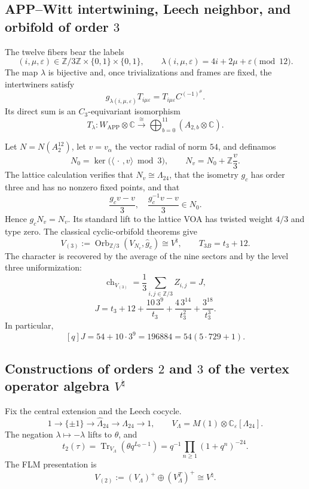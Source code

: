 \subsection{APP--Witt intertwining, Leech neighbor, and orbifold of order \(3\)}

The twelve fibers bear the labels
\[
 (i,\mu,\varepsilon)\in
 \mathbb Z/3\mathbb Z\times\{0,1\}\times\{0,1\},
 \qquad
 \lambda(i,\mu,\varepsilon)=4i+2\mu+\varepsilon\pmod{12}.
\]
The map \(\lambda\) is bijective and, once trivializations and frames are fixed,
the intertwiners satisfy
\[
 g_{\lambda(i,\mu,\varepsilon)}T_{i\mu\varepsilon}
 =T_{i\mu\varepsilon}C^{(-1)^\mu}.
\]
Its direct sum is an \(C_3\)-equivariant isomorphism
\[
 T_\lambda:W_{\mathrm{APP}}\otimes\mathbb C
 \xrightarrow{\ \cong\ }
 \bigoplus_{b=0}^{11}(A_{2,b}\otimes\mathbb C).
\]

Let \(N=N(A_2^{12})\), let \(v=v_\alpha\) the vector radial of norm \(54\),
and definamos
\[
 N_0=\ker\bigl(\langle\,\cdot\,,v\rangle\bmod3\bigr),
 \qquad N_v=N_0+\mathbb Z\frac v3.
\]
The lattice calculation verifies that \(N_v\cong\Lambda_{24}\), that the
isometry \(g_c\) has order three and has no nonzero fixed points, and that
\[
 \frac{g_cv-v}{3},\quad\frac{g_c^{-1}v-v}{3}\in N_0.
\]
Hence \(g_cN_v=N_v\). Its standard lift to the lattice VOA has twisted
weight \(4/3\) and type zero. The classical cyclic-orbifold theorems give
\[
 V_{(3)}:=\operatorname{Orb}_{\mathbb Z/3}
       (V_{N_v},\widehat g_c)\cong V^\natural,
 \qquad T_{3B}=t_3+12.
\]
The character is recovered by the average of the nine sectors and by
the level three uniformization:
\[
 \operatorname{ch}_{V_{(3)}}
 =\frac13\sum_{i,j\in\mathbb Z/3}Z_{i,j}=J,
\]
\[
 J=t_3+12+\frac{10\,3^9}{t_3}
       +\frac{4\,3^{14}}{t_3^2}+\frac{3^{18}}{t_3^3}.
\]
In particular,
\[
 [q]J=54+10\cdot3^9=196884=54(5\cdot729+1).
\]

\subsection{Constructions of orders \(2\) and \(3\) of the vertex operator algebra \texorpdfstring{\(V^\natural\)}{V natural}}

Fix the central extension and the Leech cocycle.
\[
 1\longrightarrow\{\pm1\}\longrightarrow\widehat\Lambda_{24}
 \longrightarrow\Lambda_{24}\longrightarrow1,
 \qquad
 V_\Lambda=M(1)\otimes\mathbb C_\varepsilon[\Lambda_{24}].
\]
The negation \(\lambda\mapsto-\lambda\) lifts to \(\theta\), and
\[
 t_2(\tau)=\operatorname{Tr}_{V_\Lambda}
  \left(\theta q^{L_0-1}\right)
 =q^{-1}\prod_{n\ge1}(1+q^n)^{-24}.
\]
The FLM presentation is
\[
 V_{(2)}:=(V_\Lambda)^+\oplus(V_\Lambda^T)^+\cong V^\natural.
\]

